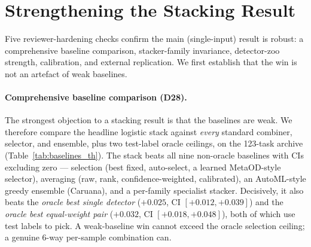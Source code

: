 \documentclass[11pt,titlepage]{article}
\begin{document}
\section{Strengthening the Stacking Result}
\label{sec:strength}
Five reviewer-hardening checks confirm the main (single-input) result is robust:
a comprehensive baseline comparison, stacker-family invariance, detector-zoo
strength, calibration, and external replication. We first establish that the win is
not an artefact of weak baselines.

\paragraph{Comprehensive baseline comparison (D28).}
The strongest objection to a stacking result is that the baselines are weak. We
therefore compare the headline logistic stack against \emph{every} standard
combiner, selector, and ensemble, plus two test-label oracle ceilings, on the
123-task archive (Table~\ref{tab:baselines_th}). The stack beats all nine non-oracle
baselines with CIs excluding zero --- selection (best fixed, auto-select, a learned
MetaOD-style selector), averaging (raw, rank, confidence-weighted, calibrated), an
AutoML-style greedy ensemble (Caruana), and a per-family specialist stacker.
Decisively, it also beats the \emph{oracle best single detector} ($+0.025$, CI
$[+0.012,+0.039]$) and the \emph{oracle best equal-weight pair} ($+0.032$, CI
$[+0.018,+0.048]$), both of which use test labels to pick. A weak-baseline win cannot
exceed the oracle selection ceiling; a genuine $6$-way per-sample combination can.
\end{document}

